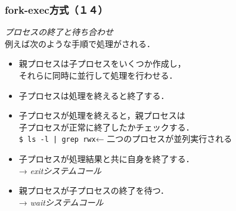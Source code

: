 \documentclass{beamer}                 %
\begin{document}
\begin{frame}[fragile]
  \frametitle{fork-exec方式（１４）}
  \emph{プロセスの終了と待ち合わせ}\\
  \vfill
  例えば次のような手順で処理がされる．
  \begin{itemize}
  \item 親プロセスは子プロセスをいくつか作成し，\\
    それらに同時に並行して処理を行わせる．
  \item 子プロセスは処理を終えると終了する．
  \item 子プロセスが処理を終えると，親プロセスは \\
    子プロセスが正常に終了したかチェックする．\\
    \vfill
    \verb;$ ls -l | grep rwx;\hfil ←  \hfil 二つのプロセスが並列実行される
    \vfill
  \item 子プロセスが処理結果と共に自身を終了する． \\
    → \emph{exitシステムコール}
  \item 親プロセスが子プロセスの終了を待つ． \\
    → \emph{waitシステムコール}
  \end{itemize}
\end{frame}
\end{document}
